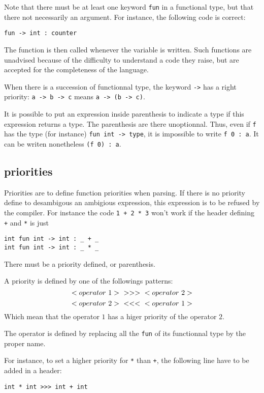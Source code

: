 \documentclass{article}
\begin{document}
Note that there must be at least one keyword \lstinline$fun$ in a functional type, but that there not necessarily an argument.
For instance, the following code is correct:
\begin{lstlisting}
fun -> int : counter
\end{lstlisting}
The function is then called whenever the variable is written.
Such functions are unadvised because of the difficulty to understand a code they raise, but are accepted for the completeness of the language.

When there is a succession of functionnal type, the keyword \lstinline$->$ has a right priority: \lstinline$a -> b -> c$ means \lstinline$a -> (b -> c)$.

It is possible to put an expression inside parenthesis to indicate a type if this expression returns a type. The parenthesis are there unoptionnal.
Thus, even if \lstinline$f$ has the type (for instance) \lstinline$fun int -> type$, it is impossible to write \lstinline$f 0 : a$.
It can be writen nonetheless \lstinline$(f 0) : a$.

\subsection{priorities}

Priorities are to define function priorities when parsing.
If there is no priority define to desambigous an ambigious expression, this expression is to be refused by the compiler.
For instance the code \lstinline$1 + 2 * 3$ won’t work if the header defining \lstinline$+$ and \lstinline$*$ is just
\begin{lstlisting}
int fun int -> int : _ + _
int fun int -> int : _ * _
\end{lstlisting}
There must be a priority defined, or parenthesis.

A priority is defined by one of the followings patterns:
\[
    <operator~1>~\textrm{\lstinline$>>>$}~<operator~2>
\]
\[
    <operator~2>~\textrm{\lstinline$<<<$}~<operator~1>
\]
Which mean that the operator $1$ has a higer priority of the operator $2$.

The operator is defined by replacing all the \lstinline$fun$ of its functionnal type by the proper name.

For instance, to set a higher priority for \lstinline$*$ than \lstinline$+$, the following line have to be added in a header:
\begin{lstlisting}
int * int >>> int + int
\end{lstlisting}
\end{document}
